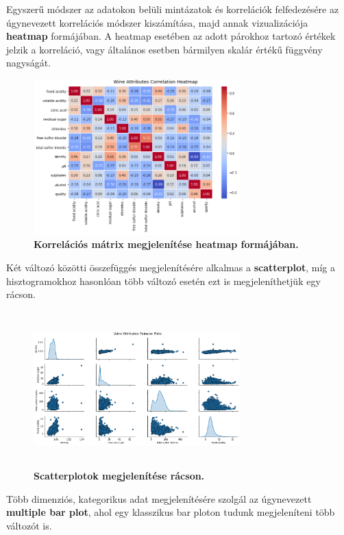 \documentclass[12pt]{article}
\theoremstyle{plain}
\begin{document}
Egyszerű módszer az adatokon belüli mintázatok és korrelációk felfedezésére az úgynevezett korrelációs módszer kiszámítása, majd annak vizualizációja \textbf{heatmap} formájában. A heatmap esetében az adott párokhoz tartozó értékek jelzik a korreláció, vagy általános esetben bármilyen skalár értékű függvény nagyságát.

\begin{figure}[H]
   \centering
   \includegraphics[width=8cm, height=6cm]{media/kormap.png}
   \caption{\textbf{Korrelációs mátrix megjelenítése heatmap formájában.}}
   \label{fig:GeneralDiagram}
\end{figure}

Két változó közötti összefüggés megjelenítésére alkalmas a \textbf{scatterplot}, míg a hisztogramokhoz hasonlóan több változó esetén ezt is megjeleníthetjük egy rácson.

\begin{figure}[H]
   \centering
   \includegraphics[width=8cm, height=6cm]{media/pariwise.png}
   \caption{\textbf{Scatterplotok megjelenítése rácson.}}
   \label{fig:GeneralDiagram}
\end{figure}

Több dimenziós, kategorikus adat megjelenítésére szolgál az úgynevezett \textbf{multiple bar plot}, ahol egy klasszikus bar ploton tudunk megjeleníteni több változót is.
\end{document}
